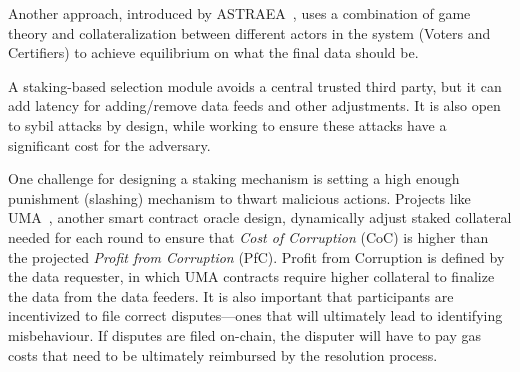 Another approach, introduced by ASTRAEA~\cite{adler2018astraea}, uses a combination of game theory and collateralization between different actors in the system (Voters and Certifiers) to achieve equilibrium on what the final data should be. 

A staking-based selection module avoids a central trusted third party, but it can add latency for adding/remove data feeds and other adjustments. It is also open to sybil attacks by design, while working to ensure these attacks have a significant cost for the adversary. 

One challenge for designing a staking mechanism is setting a high enough punishment (slashing) mechanism to thwart malicious actions. Projects like UMA~\cite{umawhitepaper}, another smart contract oracle design, dynamically adjust staked collateral needed for each round to ensure that \textit{Cost of Corruption} (CoC) is higher than the projected \textit{Profit from Corruption} (PfC). Profit from Corruption is defined by the data requester, in which UMA contracts require higher collateral to finalize the data from the data feeders. It is also important that participants are incentivized to file correct disputes---ones that will ultimately lead to identifying misbehaviour. If disputes are filed on-chain, the disputer will have to pay gas costs that need to be ultimately reimbursed by the resolution process. 



